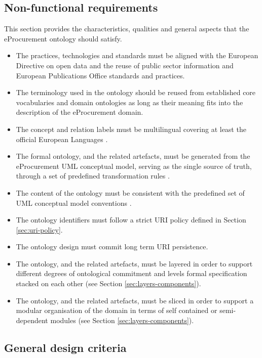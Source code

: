 	
	\subsection{Non-functional requirements}
	\label{sec:non-functional-requirements}
	
	This section provides the characteristics, qualities and general aspects that the eProcurement ontology should satisfy.
	
	\begin{itemize}
		\item The practices, technologies and standards must be aligned with the European Directive on open data and the reuse of public sector information \citep{directive-2019/1024} and European Publications Office standards and practices.
		\item The terminology used in the ontology should be reused from established core vocabularies \cite{isaHandbook2015} and domain ontologies as long as their meaning fits into the description of the eProcurement domain.
		\item The concept and relation labels must be multilingual covering at least the official European Languages \cite{styleguide-eu}.
		\item The formal ontology, and the related artefacts, must be generated from the eProcurement UML conceptual model, serving as the single source of truth, through a set of predefined transformation rules \citep{costetchi2020c}. 
		\item The content of the ontology must be consistent with the predefined set of UML conceptual model conventions \cite{costetchi2020b}.
		\item The ontology identifiers must follow a strict URI policy defined in Section \ref{sec:uri-policy}.
		\item The ontology design must commit long term URI persistence.
		\item The ontology, and the related artefacts, must be layered in order to support different degrees of ontological commitment and levels formal specification stacked on each other (see Section \ref{sec:layers-components}).
		\item The ontology, and the related artefacts,  must be sliced in order to support a modular organisation of the domain in terms of self contained or semi-dependent modules (see Section \ref{sec:layers-components}).
	\end{itemize}
	
	\subsection{General design criteria}
	\label{sec:design-criteria}
	
